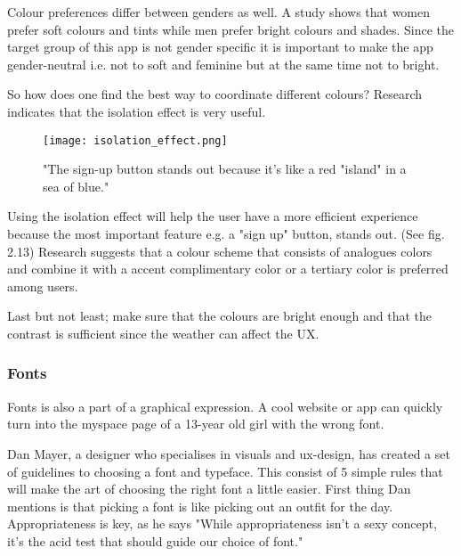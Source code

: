 Colour preferences differ between genders as well. A study shows that women prefer soft colours and tints while men prefer bright colours and shades. \cite{ColorMeaning} Since the target group of this app is not gender specific it is important to make the app gender-neutral i.e. not to soft and feminine but at the same time not to bright. 

So how does one find the best way to coordinate different colours? Research indicates that the isolation effect is very useful.

\begin{figure}[H]
\centering
\texttt{[image: isolation\_effect.png]}
\caption{"The sign-up button stands out because it's like a red "island" in a sea of blue." \cite{ColorMeaning}}
\end{figure}

Using the isolation effect will help the user have a more efficient experience because the most important feature e.g. a "sign up" button, stands out. \cite{ColorMeaning} (See fig. 2.13)%
Research suggests that a colour scheme that consists of analogues colors and combine it with a accent complimentary color or a tertiary color is preferred among users. \cite{ColorMeaning} 

Last but not least; make sure that the colours are bright enough and that the contrast is sufficient since the weather can affect the UX. \cite{Graphic}

\subsubsection{Fonts}
Fonts is also a part of a graphical expression. A cool website or app can quickly turn into the myspace page of a 13-year old girl with the wrong font.

Dan Mayer, a designer who specialises in visuals and ux-design, has created a set of guidelines to choosing a font and typeface. This consist of 5 simple rules that will make the art of choosing the right font a little easier. First thing Dan mentions is that picking a font is like picking out an outfit for the day. Appropriateness is key,  as he says "While appropriateness isn't a sexy concept, it's the acid test that should guide our choice of font." \cite{Font}

